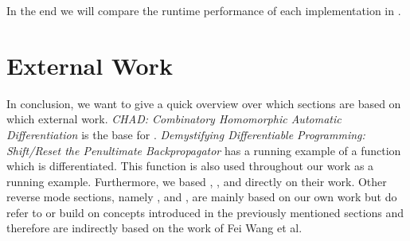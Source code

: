 In the end we will compare the runtime performance of each implementation in .

\section{External Work}
In conclusion, we want to give a quick overview over which sections are based on which external work. \emph{CHAD: Combinatory Homomorphic Automatic Differentiation} \cite{chad} is the base for . \emph{Demystifying Differentiable Programming: Shift/Reset the Penultimate Backpropagator} \cite{lantern} has a running example of a function which is differentiated. This function is also used throughout our work as a running example. Furthermore, we based , ,  and  directly on their work. Other reverse mode sections, namely ,  and , are mainly based on our own work but do refer to or build on concepts introduced in the previously mentioned sections and therefore are indirectly based on the work of Fei Wang et al.


























